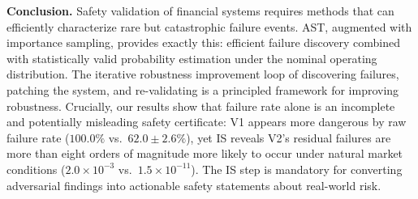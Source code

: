 \documentclass[conference]{IEEEtran}
\begin{document}
\textbf{Conclusion.}
Safety validation of financial systems requires methods that can
efficiently characterize rare but catastrophic failure events. AST,
augmented with importance sampling, provides exactly this: efficient
failure discovery combined with statistically valid probability
estimation under the nominal operating distribution. The iterative
robustness improvement loop of discovering failures, patching the system, and re-validating is
a principled framework for improving robustness. Crucially, our results
show that failure rate alone is an incomplete and potentially misleading
safety certificate: V1 appears more dangerous by raw failure rate
($100.0\%$ vs.\ $62.0 \pm 2.6\%$), yet IS reveals V2's residual failures
are more than eight orders of magnitude more likely to occur under natural
market conditions ($2.0\!\times\!10^{-3}$ vs.\ $1.5\!\times\!10^{-11}$).
The IS step is mandatory for converting adversarial findings
into actionable safety statements about real-world risk.



\end{document}
